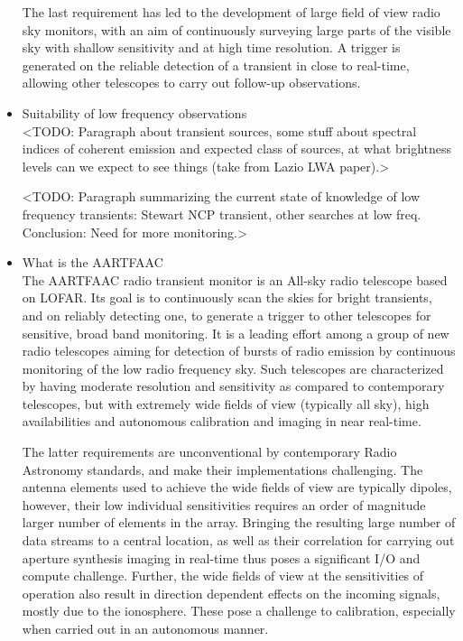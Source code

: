 \documentclass{aa}
\begin{document}
\begin{itemize}
The last requirement has led to the development of large field of view radio sky
monitors, with an  aim of continuously surveying large parts  of the visible sky
with shallow sensitivity and at high  time resolution. A trigger is generated on
the reliable  detection of  a transient  in close  to real-time,  allowing other
telescopes to carry out follow-up observations.

\item Suitability of low frequency observations \\
<TODO: Paragraph about  transient sources, some stuff about  spectral indices of
coherent emission and  expected class of sources, at what  brightness levels can
we expect to see things (take from Lazio LWA paper).>

<TODO: Paragraph  summarizing the  current state of  knowledge of  low frequency
transients: Stewart NCP transient, other  searches at low freq. Conclusion: Need
for more monitoring.>

\item What is the AARTFAAC \\
The AARTFAAC  radio transient  monitor is  an All-sky  radio telescope  based on
LOFAR. Its goal is to continuously scan  the skies for bright transients, and on
reliably detecting one, to generate a trigger to other telescopes for sensitive,
broad  band monitoring.   It is  a leading  effort among  a group  of new  radio
telescopes  aiming for  detection  of  bursts of  radio  emission by  continuous
monitoring of the low radio frequency sky.  Such telescopes are characterized by
having  moderate   resolution  and  sensitivity  as   compared  to  contemporary
telescopes, but  with extremely wide  fields of  view (typically all  sky), high
availabilities and autonomous calibration and imaging in near real-time.

The  latter  requirements are  unconventional  by  contemporary Radio  Astronomy
standards, and make their implementations challenging. The antenna elements used
to achieve  the wide fields  of view are  typically dipoles, however,  their low
individual  sensitivities  requires  an  order of  magnitude  larger  number  of
elements in the array.  Bringing the resulting large number of data streams to a
central  location,  as well  as  their  correlation  for carrying  out  aperture
synthesis  imaging  in  real-time  thus  poses a  significant  I/O  and  compute
challenge. Further,  the wide fields of  view at the sensitivities  of operation
also result in  direction dependent effects on the incoming  signals, mostly due
to  the ionosphere.  These  pose  a challenge  to  calibration, especially  when
carried out in an autonomous manner.


\end{itemize}
\end{document}
